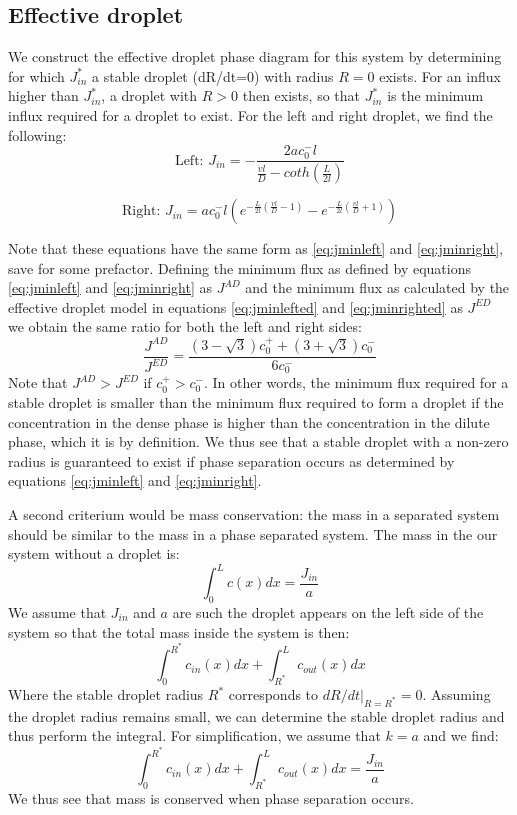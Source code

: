 \documentclass{Dissertate}
\begin{document}
\hypertarget{effective-droplet-2}{%
\subsection{Effective droplet}\label{effective-droplet-2}}

We construct the effective droplet phase diagram for this system by
determining for which \(J^{*}_{in}\) a stable droplet (dR/dt=0) with
radius \(R=0\) exists. For an influx higher than \(J_{in}^*\), a droplet
with \(R>0\) then exists, so that \(J_{in}^*\) is the minimum influx
required for a droplet to exist. For the left and right droplet, we find
the following: \begin{equation}
\text{Left:  }J_{in} = - \frac{ 2a c_0^-l}{\frac{vl}{D}-coth(\frac{L}{2l})}
\label{eq:jminlefted}\end{equation}

\begin{equation}
\text{Right: } J_{in} =ac_0^-l\left(e^{-\frac{L}{2l}(\frac{vl}{D}-1)}-e^{-\frac{L}{2l}(\frac{vl}{D}+1)}\right)
\label{eq:jminrighted}\end{equation}

Note that these equations have the same form as \ref{eq:jminleft}
and \ref{eq:jminright}, save for some prefactor. Defining the
minimum flux as defined by equations \ref{eq:jminleft} and
\ref{eq:jminright} as \(J^{AD}\) and the minimum flux as calculated
by the effective droplet model in equations \ref{eq:jminlefted} and
\ref{eq:jminrighted} as \(J^{ED}\) we obtain the same ratio for both the left and right sides: 
\[
\frac{J^{AD}}{J^{ED}} = \frac{(3-\sqrt{3})c_0^++(3+\sqrt{3})c_0^-}{6c_0^-}
\] 
Note that \(J^{AD}>J^{ED}\) if \(c_0^+>c_0^-\). In other words, the
minimum flux required for a stable droplet is smaller than the minimum
flux required to form a droplet if the concentration in the dense phase
is higher than the concentration in the dilute phase, which it is by
definition. We thus see that a stable droplet with a non-zero radius is
guaranteed to exist if phase separation occurs as determined by
equations \ref{eq:jminleft} and \ref{eq:jminright}. 

A second criterium would be mass conservation: the mass in a separated system
should be similar to the mass in a phase separated system. The mass in the our system without a droplet is:
 \[
\int_0^L c(x)dx = \frac{J_{in}}{a}
\] 
We assume that \(J_{in}\) and \(a\) are such the droplet appears on the left side of the system so that the total mass inside the system is then: \[
\int_0^{R^*}c_{in}(x)dx + \int_{R^*}^Lc_{out}(x)dx
\] 
Where the stable droplet radius \(R^*\) corresponds to
\(dR/dt|_{R=R^*}=0\). Assuming the droplet radius remains small, we can
determine the stable droplet radius and thus perform the integral. For simplification, we assume that $k=a$ and we find: 
\[
\int_0^{R^*}c_{in}(x)dx + \int_{R^*}^Lc_{out}(x)dx=\frac{J_{in}}{a}
\] 
We thus see that mass is conserved when phase separation occurs.
\end{document}
